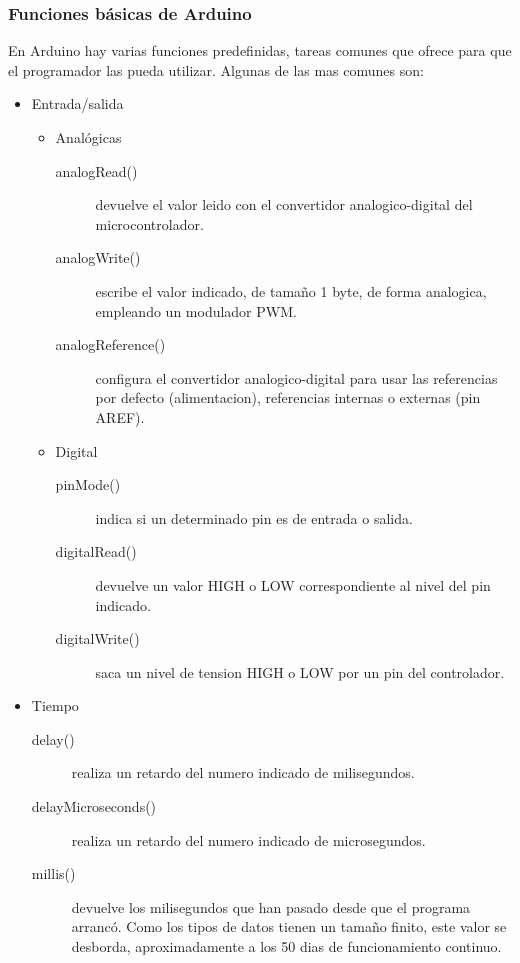 \subsubsection{Funciones básicas de Arduino}
En Arduino hay varias funciones predefinidas, tareas comunes que ofrece para que el programador las pueda utilizar. Algunas de las mas comunes son:
\begin{itemize}
    \item Entrada/salida
        \begin{itemize}
            \item Analógicas
                \begin{description}
                    \item[analogRead()] devuelve el valor leido con el convertidor analogico-digital del microcontrolador.
                    \item[analogWrite()] escribe el valor indicado, de tamaño 1 byte, de forma analogica, empleando un modulador PWM.
                    \item[analogReference()] configura el convertidor analogico-digital para usar las referencias por defecto (alimentacion), referencias internas o externas (pin AREF).
                \end{description}
            \item Digital
                \begin{description}
                    \item[pinMode()] indica si un determinado pin es de entrada o salida.
                    \item[digitalRead()] devuelve un valor HIGH o LOW correspondiente al nivel del pin indicado.
                    \item[digitalWrite()] saca un nivel de tension HIGH o LOW por un pin del controlador.
                \end{description}
        \end{itemize}
    \item Tiempo
        \begin{description}
            \item[delay()] realiza un retardo del numero indicado de milisegundos.
            \item[delayMicroseconds()] realiza un retardo del numero indicado de microsegundos.
            \item[millis()] devuelve los milisegundos que han pasado desde que el programa arrancó. Como los tipos de datos tienen un tamaño finito, este valor se desborda, aproximadamente a los 50 dias de funcionamiento continuo.

\end{description}
\end{itemize}
